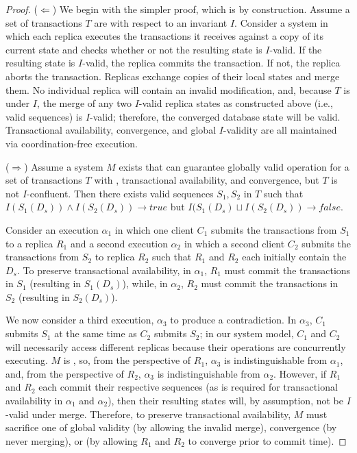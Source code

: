 \begin{proof}
($\Leftarrow$) We begin with the simpler proof, which is by
  construction. Assume a set of transactions $T$ are \iconfluent with
  respect to an invariant $I$. Consider a system in which each replica
  executes the transactions it receives against a copy of its current
  state and checks whether or not the resulting state is $I$-valid. If
  the resulting state is $I$-valid, the replica commits the
  transaction. If not, the replica aborts the transaction. Replicas
  exchange copies of their local states and merge them. No individual
  replica will contain an invalid modification, and, because $T$ is
  \iconfluent under $I$, the merge of any two $I$-valid replica states
  as constructed above (i.e., valid sequences) is $I$-valid;
  therefore, the converged database state will be valid. Transactional
  availability, convergence, and global $I$-validity are all
  maintained via coordination-free execution.

($\Rightarrow$) Assume a system $M$ exists that can guarantee globally
  valid operation for a set of transactions $T$ with \cfreedom,
  transactional availability, and convergence, but $T$ is not
  $I$-confluent. Then there exists valid sequences $S_1,S_2$ in $T$
  such that $I(S_1(D_s)) \wedge I(S_2(D_s)) \rightarrow true$ but
  $I(S_1(D_s) \sqcup I(S_2(D_s)) \rightarrow false$.

  Consider an execution $\alpha_1$ in which one client $C_1$ submits
  the transactions from $S_1$ to a replica $R_1$ and a second
  execution $\alpha_2$ in which a second client $C_2$ submits the
  transactions from $S_2$ to replica $R_2$ such that $R_1$ and $R_2$
  each initially contain the $D_s$. To preserve transactional
  availability, in $\alpha_1$, $R_1$ must commit the transactions in
  $S_1$ (resulting in $S_1(D_s)$), while, in $\alpha_2$, $R_2$ must
  commit the transactions in $S_2$ (resulting in $S_2(D_s)$).

   We now consider a third execution, $\alpha_3$ to produce a
   contradiction. In $\alpha_3$, $C_1$ submits $S_1$ at the same time
   as $C_2$ submits $S_2$; in our system model, $C_1$ and $C_2$ will
   necessarily access different replicas because their operations are
   concurrently executing. $M$ is \cfree, so, from the perspective of
   $R_1$, $\alpha_3$ is indistinguishable from $\alpha_1$, and, from
   the perspective of $R_2$, $\alpha_3$ is indistinguishable from
   $\alpha_2$. However, if $R_1$ and $R_2$ each commit their
   respective sequences (as is required for transactional availability
   in $\alpha_1$ and $\alpha_2$), then their resulting states will, by
   assumption, not be $I$-valid under merge. Therefore, to preserve
   transactional availability, $M$ must sacrifice one of global
   validity (by allowing the invalid merge), convergence (by never
   merging), or \cfreedom (by allowing $R_1$ and $R_2$ to converge
   prior to commit time).
\end{proof}

